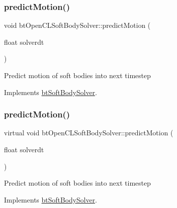 \subsubsection{\texorpdfstring{predict\+Motion()}{predictMotion()}\hspace{0.1cm}{\footnotesize\ttfamily [1/2]}}
{\footnotesize\ttfamily void bt\+Open\+C\+L\+Soft\+Body\+Solver\+::predict\+Motion (\begin{DoxyParamCaption}\item[{float}]{solverdt }\end{DoxyParamCaption})\hspace{0.3cm}{\ttfamily [virtual]}}

Predict motion of soft bodies into next timestep 

Implements \hyperlink{classbtSoftBodySolver_a72f0c095ae30002a6f98fc194a63e1ba}{bt\+Soft\+Body\+Solver}.

\mbox{\label{classbtOpenCLSoftBodySolver_a489602e08b20f977be04543e616abf46}} 
\subsubsection{\texorpdfstring{predict\+Motion()}{predictMotion()}\hspace{0.1cm}{\footnotesize\ttfamily [2/2]}}
{\footnotesize\ttfamily virtual void bt\+Open\+C\+L\+Soft\+Body\+Solver\+::predict\+Motion (\begin{DoxyParamCaption}\item[{float}]{solverdt }\end{DoxyParamCaption})\hspace{0.3cm}{\ttfamily [virtual]}}

Predict motion of soft bodies into next timestep 

Implements \hyperlink{classbtSoftBodySolver_a72f0c095ae30002a6f98fc194a63e1ba}{bt\+Soft\+Body\+Solver}.

\mbox{\label{classbtOpenCLSoftBodySolver_a4c04cb2b16b762c4768304218c664470}} 
